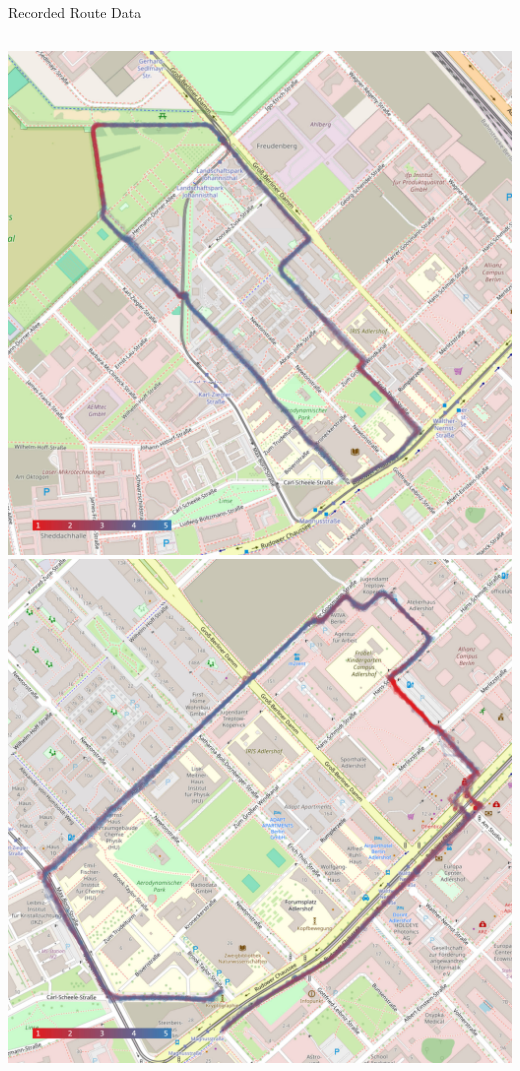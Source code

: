 \documentclass[
    english,
    accentcolor=9c,
    design=2023,
    logofile=images/hulogo.pdf,
]{tudabeamer}
\begin{document}
{
    \begin{frame}{Recorded Route Data}
        \begin{columns}[onlytextwidth,c]
            \centering
            \includegraphics[height=0.7\linewidth]{../images/ratings_north_route.jpg}
            \centering
            \includegraphics[height=0.7\linewidth]{../images/ratings_east_route.jpg}
        \end{columns}
    \end{frame}

}
\end{document}
